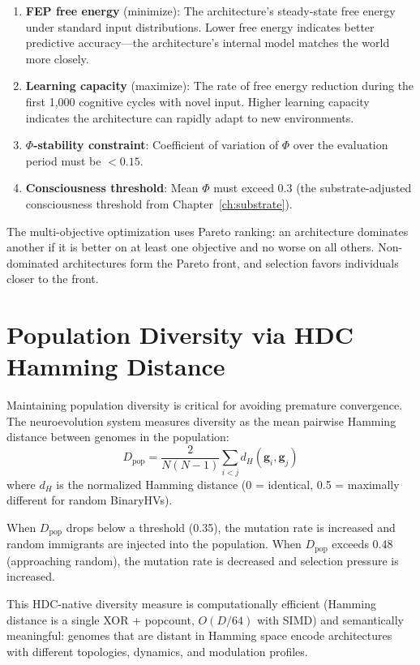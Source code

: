 \documentclass[12pt]{book}
\begin{document}
\begin{enumerate}[label=\arabic*.]
  \item \textbf{FEP free energy} (minimize): The architecture's steady-state free energy under standard input distributions. Lower free energy indicates better predictive accuracy---the architecture's internal model matches the world more closely.
  \item \textbf{Learning capacity} (maximize): The rate of free energy reduction during the first 1,000 cognitive cycles with novel input. Higher learning capacity indicates the architecture can rapidly adapt to new environments.
  \item \textbf{$\Phi$-stability constraint}: Coefficient of variation of $\Phi$ over the evaluation period must be $< 0.15$.
  \item \textbf{Consciousness threshold}: Mean $\Phi$ must exceed 0.3 (the substrate-adjusted consciousness threshold from Chapter~\ref{ch:substrate}).
\end{enumerate}

The multi-objective optimization uses Pareto ranking: an architecture dominates another if it is better on at least one objective and no worse on all others. Non-dominated architectures form the Pareto front, and selection favors individuals closer to the front.

\section{Population Diversity via HDC Hamming Distance}

Maintaining population diversity is critical for avoiding premature convergence. The neuroevolution system measures diversity as the mean pairwise Hamming distance between genomes in the population:
\begin{equation}
D_{\text{pop}} = \frac{2}{N(N-1)} \sum_{i<j} d_H(\mathbf{g}_i, \mathbf{g}_j)
\end{equation}
where $d_H$ is the normalized Hamming distance (0 = identical, 0.5 = maximally different for random BinaryHVs).

When $D_{\text{pop}}$ drops below a threshold (0.35), the mutation rate is increased and random immigrants are injected into the population. When $D_{\text{pop}}$ exceeds 0.48 (approaching random), the mutation rate is decreased and selection pressure is increased.

This HDC-native diversity measure is computationally efficient (Hamming distance is a single XOR + popcount, $O(D/64)$ with SIMD) and semantically meaningful: genomes that are distant in Hamming space encode architectures with different topologies, dynamics, and modulation profiles.
\end{document}
